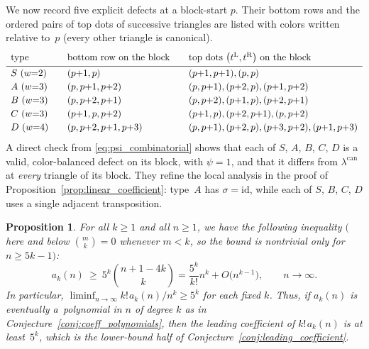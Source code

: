 \documentclass[pdftex]{sigma}
\numberwithin{equation}{section}
\newcommand{\ssp}{\hspace{1pt}}
\newtheorem{Proposition}[Theorem]{Proposition}
\theoremstyle{definition}
\begin{document}
We now record five explicit defects at a block-start $p$. Their bottom rows and
the ordered pairs of top dots of successive triangles are listed with colors
written relative to~$p$ (every other triangle is canonical).
\begin{equation}
	\label{eq:five_defects}
	\renewcommand{\arraystretch}{1.2}
	\begin{array}{l@{\qquad}l@{\qquad}l}
		\text{type} & \text{bottom row on the block} & \text{top dots $\bigl(t^{\mathrm L},t^{\mathrm R}\bigr)$ on the block}\\[2pt]\hline
		S\ (w{=}2) & (p{+}1,p) & (p{+}1,p{+}1),(p,p)\\
		A\ (w{=}3) & (p,p{+}1,p{+}2) & (p,p{+}1),(p{+}2,p),(p{+}1,p{+}2)\\
		B\ (w{=}3) & (p,p{+}2,p{+}1) & (p,p{+}2),(p{+}1,p),(p{+}2,p{+}1)\\
		C\ (w{=}3) & (p{+}1,p,p{+}2) & (p{+}1,p),(p{+}2,p{+}1),(p,p{+}2)\\
		D\ (w{=}4) & (p,p{+}2,p{+}1,p{+}3) & (p,p{+}1),(p{+}2,p),(p{+}3,p{+}2),(p{+}1,p{+}3)
	\end{array}
\end{equation}
A direct check from \eqref{eq:psi_combinatorial} shows that each of
$S$, $A$, $B$, $C$, $D$ is a valid, color-balanced defect on its block, with $\psi=1$, and
that it differs from $\lambda^{\mathrm{can}}$ at \emph{every} triangle of its
block. They refine the local analysis in the proof of
Proposition~\ref{prop:linear_coefficient}: type~$A$ has $\sigma=\mathrm{id}$, while each of
$S$, $B$, $C$, $D$ uses a single adjacent transposition.

\begin{Proposition}
	\label{prop:leading_lower_bound}
	For all $k\ge 1$ and all $n\ge 1$, we have
	the following inequality $($here and below $\binom{m}{k}=0$ whenever $m<k$,
	so the bound is nontrivial only for $n\ge 5k-1)$:
	\begin{equation}
		\label{eq:leading_lower_bound}
		a_k(n)\ \ge\ 5^{k}\binom{n+1-4k}{k}
		 = \frac{5^{k}}{k!} n^{k}+O \bigl(n^{k-1}\bigr),
		\qquad n\to\infty.
	\end{equation}
	In particular, $\liminf_{n\to\infty}k!\ssp a_k(n)/n^{k}\ge 5^{k}$ for each
	fixed $k$. Thus, if $a_k(n)$ is eventually a~polynomial in $n$ of degree $k$
	as in Conjecture~{\rm \ref{conj:coeff_polynomials}}, then the leading coefficient of
	$k!\ssp a_k(n)$ is at least~$5^{k}$, which is the lower-bound half of
	Conjecture~{\rm \ref{conj:leading_coefficient}}.
\end{Proposition}
\end{document}
